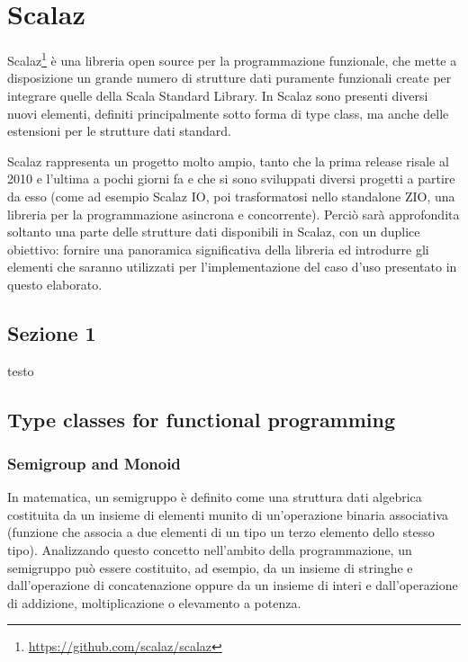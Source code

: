 \chapter{Scalaz} %

\label{Chapter1} %

Scalaz\footnote{\url{https://github.com/scalaz/scalaz}} è una libreria open source per la programmazione funzionale, che mette a disposizione un grande numero di strutture dati puramente funzionali create per integrare quelle della Scala Standard Library. In Scalaz sono presenti diversi nuovi elementi, definiti principalmente sotto forma di type class, ma anche delle estensioni per le strutture dati standard.

Scalaz rappresenta un progetto molto ampio, tanto che la prima release risale al 2010 e l'ultima a pochi giorni fa e che si sono sviluppati diversi progetti a partire da esso (come ad esempio Scalaz IO, poi trasformatosi nello standalone ZIO, una libreria per la programmazione asincrona e concorrente). Perciò sarà approfondita soltanto una parte delle strutture dati disponibili in Scalaz, con un duplice obiettivo: fornire una panoramica significativa della libreria ed introdurre gli elementi che saranno utilizzati per l'implementazione del caso d'uso presentato in questo elaborato.


\section{Sezione 1}

testo

\section{Type classes for functional programming}

\newpage

\subsection{Semigroup and Monoid}

In matematica, un semigruppo è definito come una struttura dati algebrica costituita da un insieme di elementi munito di un'operazione binaria associativa (funzione che associa a due elementi di un tipo un terzo elemento dello stesso tipo). Analizzando questo concetto nell'ambito della programmazione, un semigruppo può essere costituito, ad esempio, da un insieme di stringhe e dall'operazione di concatenazione oppure da un insieme di interi e dall'operazione di addizione, moltiplicazione o elevamento a potenza.

